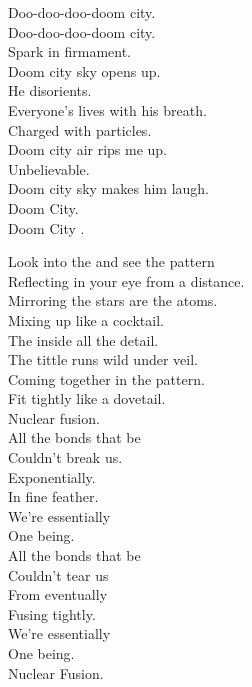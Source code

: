 Doo-doo-doo-doom city. \\
Doo-doo-doo-doom city. \\

Spark in firmament. \\
Doom city sky opens up. \\
He disorients. \\
Everyone's lives with his breath. \\
Charged with particles. \\
Doom city air rips me up. \\
Unbelievable. \\
Doom city sky makes him laugh. \\

Doom City. \\
Doom City . \\




Look into the  and see the pattern \\
Reflecting in your eye from a distance. \\
Mirroring the stars are the atoms. \\
Mixing up like a cocktail. \\

The  inside all the detail. \\
The tittle runs wild under veil. \\
Coming together in the pattern. \\
Fit tightly like a dovetail. \\

Nuclear fusion. \\

All the bonds that be \\
Couldn't break us. \\
Exponentially. \\
In fine feather. \\
We're essentially \\
One being. \\

All the bonds that be \\
Couldn't tear us \\
From eventually \\
Fusing tightly. \\
We're essentially \\
One being. \\
Nuclear Fusion. \\

